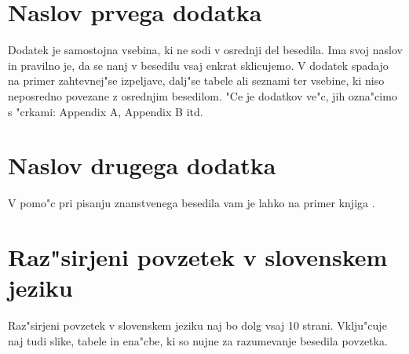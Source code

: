\cleardoublepage{}
\renewcommand\appendixname{Appendix}
\begin{appendices}

%
\chapter{Naslov prvega dodatka}
    
Dodatek je samostojna vsebina, ki ne sodi v osrednji del besedila. 
Ima svoj naslov in pravilno je, da se nanj v besedilu vsaj enkrat sklicujemo.
V dodatek spadajo na primer zahtevnej"se izpeljave, dalj"se tabele ali seznami ter vsebine, ki niso neposredno povezane z osrednjim besedilom. 
"Ce je dodatkov ve"c, jih ozna"cimo s "crkami: Appendix A, Appendix B itd.

%
\chapter{Naslov drugega dodatka}
    
V pomo"c pri pisanju znanstvenega besedila vam je lahko na primer knjiga \cite{All}.

\end{appendices}


\cleardoublepage{}
{}
\chapter*{Raz"sirjeni povzetek v slovenskem jeziku}

\foreignlanguage{slovene}{  %
Raz"sirjeni povzetek v slovenskem jeziku naj bo dolg vsaj 10 strani. 
Vklju"cuje naj tudi slike, tabele in ena"cbe, ki so nujne za razumevanje besedila povzetka.
}


\cleardoublepage
\printindex


\cleardoublepage{}
{}
